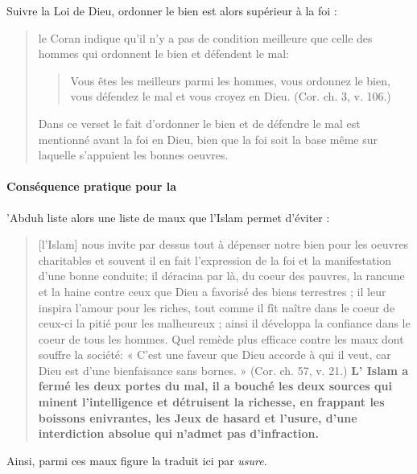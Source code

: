 Suivre la Loi de Dieu, ordonner le bien est alors supérieur à la foi : 

\begin{quote}
  le Coran indique
qu'il n'y a pas de condition meilleure que celle des hommes qui ordonnent
le bien et défendent le mal: \begin{quote}
    Vous êtes les meilleurs parmi les hommes,
vous ordonnez le bien, vous défendez le mal et vous croyez en Dieu. (Cor. ch. 3, v. 106.) 
\end{quote} 
 
Dans ce verset le fait d'ordonner le bien et de
défendre le mal est mentionné avant la foi en Dieu, bien que la foi soit la base même sur laquelle s'appuient les bonnes oeuvres. 
\cite[p 121]{Abdou:Rissalat}
\end{quote}

\paragraph{Conséquence pratique pour la \riba}
'Abduh liste alors une liste de maux que l'Islam permet d'éviter : 
\begin{quote}

[l'Islam] nous invite par dessus tout à dépenser notre bien pour les oeuvres
charitables et souvent il en fait l'expression de la foi et la manifestation
d'une bonne conduite; il déracina par là, du coeur des pauvres, la rancune
et la haine contre ceux que Dieu a favorisé des biens terrestres ; il leur
inspira l'amour pour les riches, tout comme il fît naître dans le coeur de
ceux-ci la pitié pour les malheureux ; ainsi il développa la confiance dans
le coeur de tous les hommes. Quel remède plus efficace contre les maux
dont souffre la société: « C'est une faveur que Dieu accorde à qui il veut,
car Dieu est d'une bienfaisance sans bornes. » (Cor. ch. 57, v. 21.)
\textbf{L' Islam a fermé les deux portes du mal, il a bouché les deux sources
qui minent l'intelligence et détruisent la richesse, en frappant les boissons
enivrantes, les Jeux de hasard et l'usure, d'une interdiction absolue qui
n'admet pas d'infraction.}
\cite[p 122]{Abdou:Rissalat}
\end{quote}
Ainsi, parmi ces maux figure la \riba traduit ici par \textit{usure}.


